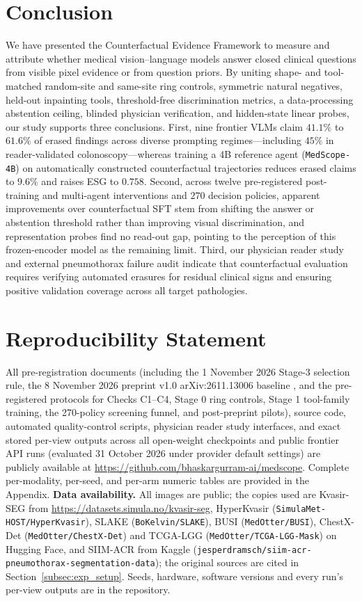 \documentclass{article} %
\begin{document}
\section{Conclusion}
\label{sec:conclusion}
We have presented the Counterfactual Evidence Framework to measure and attribute whether medical vision--language models answer closed clinical questions from visible pixel evidence or from question priors. By uniting shape- and tool-matched random-site and same-site ring controls, symmetric natural negatives, held-out inpainting tools, threshold-free discrimination metrics, a data-processing abstention ceiling, blinded physician verification, and hidden-state linear probes, our study supports three conclusions. First, nine frontier VLMs claim $41.1\%$ to $61.6\%$ of erased findings across diverse prompting regimes---including $45\%$ in reader-validated colonoscopy---whereas training a 4B reference agent (\texttt{MedScope-4B}) on automatically constructed counterfactual trajectories reduces erased claims to $9.6\%$ and raises ESG to $0.758$. Second, across twelve pre-registered post-training and multi-agent interventions and $270$ decision policies, apparent improvements over counterfactual SFT stem from shifting the answer or abstention threshold rather than improving visual discrimination, and representation probes find no read-out gap, pointing to the perception of this frozen-encoder model as the remaining limit. Third, our physician reader study and external pneumothorax failure audit indicate that counterfactual evaluation requires verifying automated erasures for residual clinical signs and ensuring positive validation coverage across all target pathologies.

\section*{Reproducibility Statement}
All pre-registration documents (including the 1 November 2026 Stage-3 selection rule, the 8 November 2026 preprint v1.0 arXiv:2611.13006 baseline \citep{gurram2026medscope}, and the pre-registered protocols for Checks C1--C4, Stage 0 ring controls, Stage 1 tool-family training, the 270-policy screening funnel, and post-preprint pilots), source code, automated quality-control scripts, physician reader study interfaces, and exact stored per-view outputs across all open-weight checkpoints and public frontier API runs (evaluated 31 October 2026 under provider default settings) are publicly available at \url{https://github.com/bhaskargurram-ai/medscope}. Complete per-modality, per-seed, and per-arm numeric tables are provided in the Appendix. \textbf{Data availability.} All images are public; the copies used are Kvasir-SEG from \url{https://datasets.simula.no/kvasir-seg}, HyperKvasir (\texttt{SimulaMet-HOST/HyperKvasir}), SLAKE (\texttt{BoKelvin/SLAKE}), BUSI (\texttt{MedOtter/BUSI}), ChestX-Det (\texttt{MedOtter/ChestX-Det}) and TCGA-LGG (\texttt{MedOtter/TCGA-LGG-Mask}) on Hugging Face, and SIIM-ACR from Kaggle (\texttt{jesperdramsch/siim-acr-pneumothorax-segmentation-data}); the original sources are cited in Section~\ref{subsec:exp_setup}. Seeds, hardware, software versions and every run's per-view outputs are in the repository.
\end{document}
